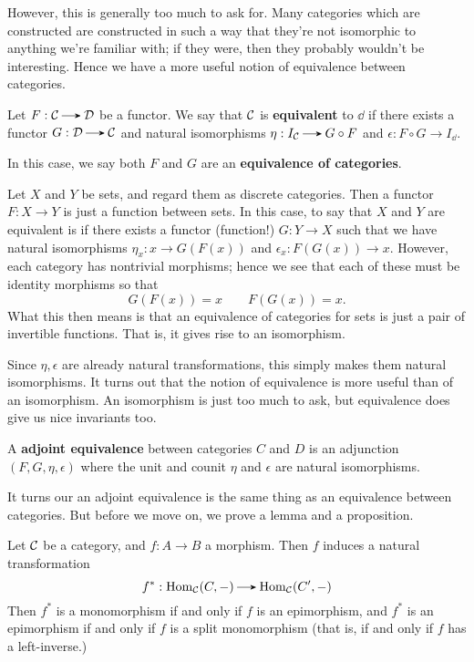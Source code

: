     However, this is generally too much to ask for. Many categories
    which are constructed are constructed in such a way that they're
    not isomorphic to anything we're familiar with; if they were, then
    they probably wouldn't be interesting.
    Hence we have a more useful notion of equivalence between
    categories. 

    \begin{definition}
        Let $F : \cc \to \dd$ be a functor. We say that $\mathcal{C}$ is
        \textbf{equivalent} to $\dd$ if there exists a functor $G:\dd \to \cc$
        and natural isomorphisms $\eta: I_\cc \to G \circ F $ and
        $\epsilon: F \circ G \to I_\dd$.

        In this case, we say both $F$ and $G$ are an \textbf{equivalence of categories}.
    \end{definition}

    \begin{example}
        Let $X$ and $Y$ be sets, and regard them as discrete categories. Then a
        functor $F: X \to Y$ is just a function between sets. In this case, to say 
        that $X$ and $Y$ are equivalent is if there exists a functor (function!) 
        $G: Y \to X$ such that we have natural isomorphisms 
        $\eta_x: x \to G(F(x))$ and $\epsilon_x: F(G(x)) \to x$. However, 
        each category has nontrivial morphisms; hence we see that each of 
        these must be identity morphisms so that 
        \[
            G(F(x)) = x \qquad F(G(x)) = x.
        \]
        What this then means is that an equivalence of categories 
        for sets is just a pair of invertible functions. That is, 
        it gives rise to an isomorphism. 
    \end{example}

    Since $\eta, \epsilon$ are already natural transformations, this
    simply makes them natural isomorphisms. It turns out that the
    notion of equivalence is more useful than of an isomorphism. An
    isomorphism is just too much to ask, but equivalence does give us
    nice invariants too. 

    \begin{definition}
        A \textbf{adjoint equivalence} between categories $C$ and $D$
        is an adjunction $(F, G, \eta, \epsilon)$ where the unit and
        counit $\eta$ and $\epsilon$ are natural isomorphisms.
    \end{definition}

    It turns our an adjoint equivalence is the same thing as an
    equivalence between categories. But before we move on, we prove a
    lemma and a proposition.
    \begin{lemma}
        Let $\mathcal{C}$ be a category, and $f: A \to B$ a morphism. Then 
        $f$ induces a natural transformation 
        \[
            f^*: \hom_{\cc}(C, -) \to \hom_{\cc}(C', -)
        \]
        Then $f^{*}$ is a monomorphism if and only if $f$ is an epimorphism, 
        and $f^{*}$ is an epimorphism if and only if $f$ is a split monomorphism 
        (that is, if and only if $f$ has a left-inverse.)
    \end{lemma}


